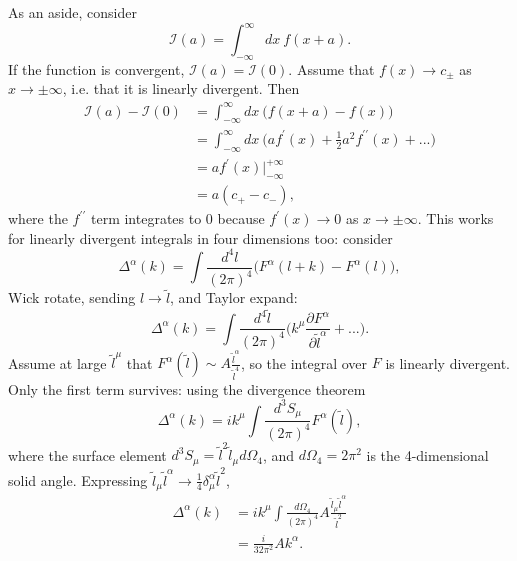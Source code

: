 As an aside, consider 
\begin{equation}
\mathcal{I}(a) = \int_{-\infty}^{\infty} dx\ f(x+a).
\end{equation}
If the function is convergent, $\mathcal{I}(a) = \mathcal{I}(0)$. Assume that $f(x) \to c_\pm$ as $x \to \pm \infty$, i.e. that it is linearly divergent. Then
\begin{equation}
\begin{split}
\mathcal{I}(a) - \mathcal{I}(0) &= \int_{-\infty}^{\infty} dx\ \big( f(x+a) - f(x) \big) \\
&= \int_{-\infty}^{\infty} dx\ \big( a f^\prime(x) + \frac{1}{2} a^2 f^{\prime \prime}(x) + ... \big) \\
&= a f^\prime(x)|^{+\infty}_{-\infty} \\
&= a(c_+ - c_-),
\end{split}
\end{equation}
where the $f^{\prime \prime}$ term integrates to 0 because $f^\prime(x) \to 0$ as $x \to \pm \infty$. This works for linearly divergent integrals in four dimensions too: consider
\begin{equation}
\Delta^\alpha(k) = \int \frac{d^4l}{(2 \pi)^4} \big( F^\alpha (l+k) - F^\alpha(l) \big),
\end{equation}
Wick rotate, sending $l \to \tilde{l}$, and Taylor expand:
\begin{equation}
\Delta^\alpha(k) = \int \frac{d^4\tilde{l}}{(2 \pi)^4} \bigg( k^\mu \frac{\partial F^\alpha}{\partial \tilde{l}^\alpha} + ... \bigg).
\end{equation}
Assume at large $\tilde{l}^\mu$ that $F^\alpha(\tilde{l}) \sim A\frac{\tilde{l}^\alpha}{\tilde{l}^4}$, so the integral over $F$ is linearly divergent. Only the first term survives: using the divergence theorem
\begin{equation}
\Delta^\alpha(k) = ik^\mu \int \frac{d^3 S_\mu}{(2\pi)^4} F^\alpha(\tilde{l}),
\end{equation}
where the surface element $d^3 S_\mu = \tilde{l}^2 \tilde{l}_\mu d\Omega_4$, and $d\Omega_4 = 2\pi^2$ is the 4-dimensional solid angle. Expressing $\tilde{l}_\mu \tilde{l}^\alpha \to \frac{1}{4}\delta_\mu^\alpha \tilde{l}^2$,
\begin{equation}
\begin{split}
\Delta^\alpha(k) &= ik^\mu \int \frac{d\Omega_4}{(2\pi)^4} A \frac{\tilde{l}_\mu \tilde{l}^\alpha}{ \tilde{l}^2} \\
&= \frac{i}{32\pi^2} A k^\alpha.
\end{split}
\end{equation}
